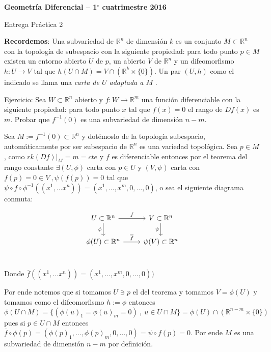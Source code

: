 \documentclass[11pt]{article}
\newcommand{\R}{{\mathbb{R}}}
\newcommand{\sett}[1]{\{#1\}}
\newenvironment{proof}[1][Demostraci\'on]{\begin{trivlist}
\item[\hskip \labelsep {\bfseries #1}]}{\end{trivlist}}
\newcommand{\qed}{\nobreak \ifvmode \relax \else
      \ifdim\lastskip<1.5em \hskip-\lastskip
      \hskip1.5em plus0em minus0.5em \fi \nobreak
      \vrule height0.75em width0.5em depth0.25em\fi}
\begin{document}
\pagestyle{empty}
\pagestyle{fancy}
\fancyfoot[CO]{\slshape \thepage}
\renewcommand{\headrulewidth}{0pt}



\centerline{\bf Geometr\'ia Diferencial -- 1$^\circ$
cuatrimestre 2016}
\centerline{\sc Entrega Pr\'actica 2}

\bigskip

\textbf{Recordemos}: Una subvariedad de $\R^n$ de dimensi\'on $k$ es un conjunto $M \subset \R^n$ con la
topolog\'ia de subespacio con la siguiente propiedad: para todo punto $p \in M$
existen un entorno abierto $U$ de $p$, un abierto $V$ de $\R^n$ y un difeomorfismo $h: U
\to V$ tal que $h(U \cap M) = V \cap (\R^k \times \{0\})$. Un par $(U, h)$ como el
indicado se llama una \emph{carta de $U$ adaptada a $M$} .

Ejercicio: Sea $W \subset \R^n$ abierto y $f: W \to \R^m$ una funci\'on diferenciable con la
	siguiente propiedad:	para todo punto $x$ tal que $f(x) = 0$ el rango de $Df(x)$ es $m$.
	Probar que $f^{-1}(0)$ es una subvariedad de dimensi\'on $n-m$.

\begin{proof}

Sea $M := f^{-1}(0) \subset \R^n$ y dot\'emoslo de la topolog\'ia subespacio, autom\'aticamente por ser subespacio de $\R^n$ es una variedad topol\'ogica. Sea $p \in M$, como $rk(Df)|_{M} = m = cte$ y $f$ es diferenciable entonces por el teorema del rango constante $\exists (U,\phi)$ carta con $p \in U$ y $(V,\psi)$ carta con $f(p)=0 \in V \ , \psi(f(p))=0$ tal que $\psi \circ f \circ \phi ^{-1}((x^1 , \dots x^n)) = (x^1 , \dots , x^{m} , 0 , \dots , 0 )$, o sea el siguiente diagrama conmuta:

\[
\begin{tikzcd}
U \subset \R^n \arrow{r}{f} \arrow[swap]{d}{\phi} & V \subset \R^n \arrow[swap]{d}{\psi} \\ 
\phi(U) \subset \R^n \arrow{r}{\overline{f}} & \psi(V) \subset \R^n \\ 
\end{tikzcd}
\]

Donde $\overline{f}((x^1 , \dots x^n)) = (x^1 , \dots , x^{m} , 0 , \dots , 0 ))$


Por ende notemos que si tomamos $U \ni p$ el del teorema y tomamos $V=\phi(U)$ y tomamos como el difeomorfismo $h := \phi$ entonces $\phi(U \cap M) = \sett{(\phi(u)_1 = \phi(u)_m = 0) \ , \ u \in U \cap M} = \phi(U) \cap (\R^{n-m} \times \sett{0})$ pues si $p \in U \cap M$ entonces $\overline{f} \circ \phi (p)= (\phi(p)_1, \dots , \phi(p)_m , 0 , \dots , 0) = \psi \circ f (p) = 0$. Por ende $M$ es una subvariedad de dimensi\'on $n-m$ por definici\'on. \qed
\end{proof}
\end{document}

